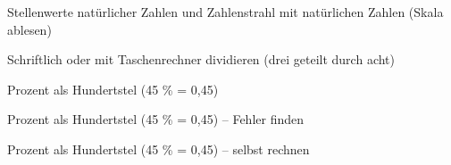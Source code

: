 \begin{aufgabe}{Stellenwerte natürlicher Zahlen und Zahlenstrahl mit natürlichen Zahlen (Skala ablesen)}
\end{aufgabe}

\begin{aufgabe}{Schriftlich oder mit Taschenrechner dividieren (drei geteilt durch acht)}
\end{aufgabe}

\begin{aufgabe}{Prozent als Hundertstel (45 \% = 0,45)}
\end{aufgabe}

\begin{aufgabe}{Prozent als Hundertstel (45 \% = 0,45) – Fehler finden}
\end{aufgabe}

\begin{aufgabe}{Prozent als Hundertstel (45 \% = 0,45) – selbst rechnen}
\end{aufgabe}
